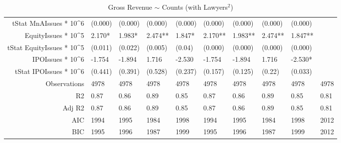 \begin{table}[ht]
\begin{tabular}{rlllllllll}
  tStat MnAIssues * 10^6 & (0.000) & (0.000) & (0.000) & (0.000) & (0.000) & (0.000) & (0.000) & (0.000) &  \\ 
  EquityIssues * 10^5 & 2.170* & 1.983* & 2.474** & 1.847* & 2.170** & 1.983** & 2.474** & 1.847** &  \\ 
  tStat EquityIssues * 10^5 & (0.011) & (0.022) & (0.005) & (0.04) & (0.000) & (0.000) & (0.000) & (0.000) &  \\ 
  IPOIssues * 10^6 & -1.754 & -1.894 & 1.716 & -2.530 & -1.754 & -1.894 & 1.716 & -2.530* &  \\ 
  tStat IPOIssues * 10^6 & (0.441) & (0.391) & (0.528) & (0.237) & (0.157) & (0.125) & (0.22) & (0.033) &  \\ 
  Observations & 4978 & 4978 & 4978 & 4978 & 4978 & 4978 & 4978 & 4978 & 4978 \\ 
  R2 & 0.87 & 0.86 & 0.89 & 0.85 & 0.87 & 0.86 & 0.89 & 0.85 & 0.81 \\ 
  Adj R2 & 0.87 & 0.86 & 0.89 & 0.85 & 0.87 & 0.86 & 0.89 & 0.85 & 0.81 \\ 
  AIC & 1994 & 1995 & 1984 & 1998 & 1994 & 1995 & 1984 & 1998 & 2012 \\ 
  BIC & 1995 & 1996 & 1987 & 1999 & 1995 & 1996 & 1987 & 1999 & 2012 \\ 
   \hline
\end{tabular}
\caption{Gross Revenue $\sim$ Counts (with Lawyers$^2$)} 
\end{table}
